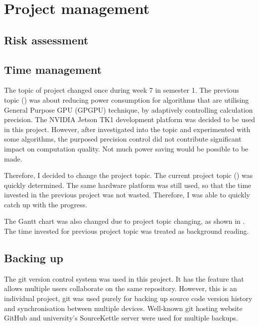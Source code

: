 \chapter{Project management}

\section{Risk assessment}

\section{Time management}

The topic of project changed once during week 7 in semester 1. The previous topic () was about reducing power consumption for algorithms that are utilising General Purpose GPU (GPGPU) technique, by adaptively controlling calculation precision. The NVIDIA Jetson TK1 development platform was decided to be used in this project. However, after investigated into the topic and experimented with some algorithms, the purposed precision control did not contribute significant impact on computation quality. Not much power saving would be possible to be made.

Therefore, I decided to change the project topic. The current project topic () was quickly determined. The same hardware platform was still used, so that the time invested in the previous project was not wasted. Therefore, I was able to quickly catch up with the progress.

The Gantt chart was also changed due to project topic changing, as shown in . The time invested for previous project topic was treated as background reading.

\section{Backing up}


The git version control system \cite{git} was used in this project. It has the feature that allows multiple users collaborate on the same repository. However, this is an individual project, git was used purely for backing up source code version history and synchronisation between multiple devices. Well-known git hosting website GitHub \cite{github} and university's SourceKettle server \cite{sourcekettle} were used for multiple backups.

